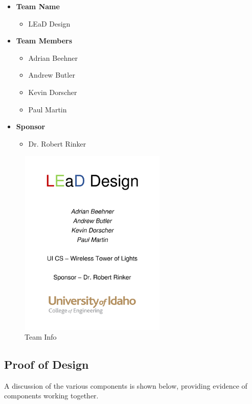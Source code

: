 \documentclass[12pt]{article}
\begin{document}
	{\renewcommand\labelitemi{}
		\begin{itemize}
			\item \textbf{Team Name}
			\begin{itemize}
				\item LEaD Design
			\end{itemize}
			\item \textbf{Team Members}
			\begin{itemize}
				\item Adrian Beehner
				\item Andrew Butler
				\item Kevin Dorscher
				\item Paul Martin
			\end{itemize}
			\item \textbf{Sponsor}
			\begin{itemize}
				\item Dr. Robert Rinker
			\end{itemize}
		\end{itemize}
	
		\begin{figure}[!htb]
			\centering
			\includegraphics[width = 70mm, height = 90mm]{assets/Team_Info.png}
			\caption{Team Info \label{overflow}}
		\end{figure}
	
	\subsection{Proof of Design}
		A discussion of the various components is shown below, providing evidence of components working together.
	
}
\end{document}
